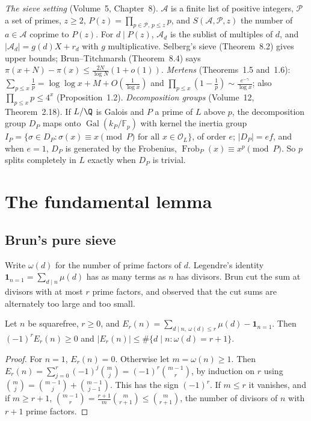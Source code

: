 \begin{reminder}
\emph{The sieve setting} (Volume~5, Chapter~8). $\mathcal A$ is a finite list of positive integers, $\mathcal P$ a set of primes, $z\ge2$, $P(z)=\prod_{p\in\mathcal P,\,p\le z}p$, and $S(\mathcal A,\mathcal P,z)$ the number of $a\in\mathcal A$ coprime to $P(z)$. For $d\mid P(z)$, $\mathcal A_d$ is the sublist of multiples of $d$, and
$|\mathcal A_d|=g(d)X+r_d$ with $g$ multiplicative. Selberg's sieve (Theorem~8.2) gives upper bounds; Brun--Titchmarsh (Theorem~8.4) says $\pi(x+N)-\pi(x)\le\frac{2N}{\log N}(1+o(1))$. \emph{Mertens} (Theorems~1.5 and~1.6): $\sum_{p\le x}\frac1p=\log\log x+M+O(\frac1{\log x})$ and $\prod_{p\le x}(1-\frac1p)\sim\frac{e^{-\gamma}}{\log x}$; also $\prod_{p\le x}p\le4^x$ (Proposition~1.2).
\emph{Decomposition groups} (Volume~12, Theorem~2.18). If $L/\Q$ is Galois and $P$ a prime of $L$ above $p$, the decomposition group $D_P$ maps onto $\operatorname{Gal}(k_P/\mathbb F_p)$ with kernel the inertia group $I_P=\{\sigma\in D_P:\sigma(x)\equiv x\pmod P\text{ for all }x\in\mathcal O_L\}$, of order $e$; $|D_P|=ef$, and when $e=1$, $D_P$ is generated by the Frobenius, $\operatorname{Frob}_P(x)\equiv x^p\pmod P$. So $p$ splits completely in $L$ exactly when $D_P$ is trivial.
\end{reminder}

\section{The fundamental lemma}

\subsection*{Brun's pure sieve}

Write $\omega(d)$ for the number of prime factors of $d$. Legendre's identity $\mathbf 1_{n=1}=\sum_{d\mid n}\mu(d)$ has as many terms as $n$ has divisors. Brun cut the sum at divisors with at most $r$ prime factors, and observed that the cut sums are alternately too large and too small.

\begin{lemma}[Bonferroni]\label{lem:bonf}
Let $n$ be squarefree, $r\ge0$, and $E_r(n)=\sum_{d\mid n,\ \omega(d)\le r}\mu(d)-\mathbf 1_{n=1}$. Then $(-1)^rE_r(n)\ge0$ and $|E_r(n)|\le\#\{d\mid n:\omega(d)=r+1\}$.
\end{lemma}
\begin{proof}
For $n=1$, $E_r(n)=0$. Otherwise let $m=\omega(n)\ge1$. Then $E_r(n)=\sum_{j=0}^r(-1)^j\binom mj=(-1)^r\binom{m-1}r$, by induction on $r$ using $\binom mj=\binom{m-1}j+\binom{m-1}{j-1}$. This has the sign $(-1)^r$. If $m\le r$ it vanishes, and if $m\ge r+1$, $\binom{m-1}r=\frac{r+1}m\binom m{r+1}\le\binom m{r+1}$, the number of divisors of $n$ with $r+1$ prime factors.
\end{proof}

